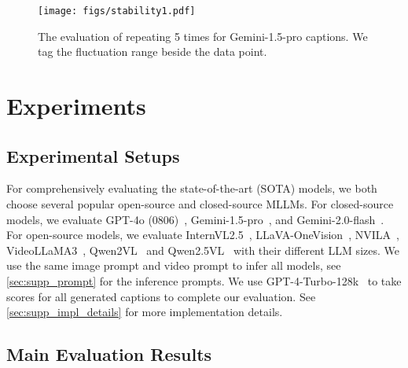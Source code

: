 \begin{figure}[!t]
\centering
\texttt{[image: figs/stability1.pdf]}
\caption{The evaluation of repeating 5 times for Gemini-1.5-pro captions. We tag the fluctuation range beside the data point.}
\label{fig:stability1}
\vspace{-8pt}
\end{figure}


\section{Experiments}

\subsection{Experimental Setups}
For comprehensively evaluating the state-of-the-art (SOTA) models, we both choose several popular open-source and closed-source MLLMs. For closed-source models, we evaluate GPT-4o (0806)~\cite{gpt4o}, Gemini-1.5-pro~\cite{gemini1.5}, and Gemini-2.0-flash~\cite{gemini2.0}.
For open-source models, we evaluate InternVL2.5~\cite{internvl2.5}, LLaVA-OneVision~\cite{llavaov}, NVILA~\cite{nvila}, VideoLLaMA3~\cite{videollama3}, Qwen2VL~\cite{qwen2vl} and Qwen2.5VL~\cite{qwen2.5vl} with their different LLM sizes. We use the same image prompt and video prompt to infer all models, see \cref{sec:supp_prompt} for the inference prompts. We use GPT-4-Turbo-128k~\cite{gpt4} to take scores for all generated captions to complete our evaluation. See \cref{sec:supp_impl_details} for more implementation details.

\subsection{Main Evaluation Results}

